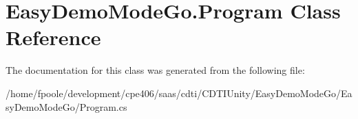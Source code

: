 \hypertarget{class_easy_demo_mode_go_1_1_program}{}\section{Easy\+Demo\+Mode\+Go.\+Program Class Reference}
\label{class_easy_demo_mode_go_1_1_program}


The documentation for this class was generated from the following file\+:\begin{DoxyCompactItemize}
\item 
/home/fpoole/development/cpe406/saas/cdti/\+C\+D\+T\+I\+Unity/\+Easy\+Demo\+Mode\+Go/\+Easy\+Demo\+Mode\+Go/Program.\+cs\end{DoxyCompactItemize}
